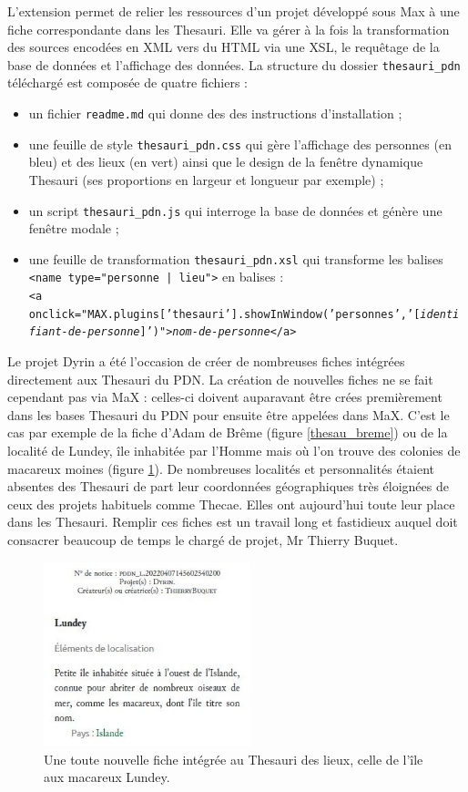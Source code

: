 \documentclass[a4paper,12pt,twoside]{book}
\begin{document}
L'extension permet de relier les ressources d'un projet développé sous Max à une fiche correspondante dans les Thesauri. Elle va gérer à la fois la transformation des sources encodées en XML vers du \acrshort{HTML} via une \acrshort{XSL}, le requêtage de la base de données et l'affichage des données. La structure du dossier \texttt{thesauri\_pdn} téléchargé est composée de quatre fichiers :
\begin{itemize}
    \item un fichier \texttt{readme.md} qui donne des  des instructions d'installation ;
    \item une feuille de style  \texttt{thesauri\_pdn.css} qui gère l'affichage des personnes (en bleu) et des lieux (en vert) ainsi que le design de la fenêtre dynamique Thesauri (ses proportions en largeur et longueur par exemple) ;
    \item un script \texttt{thesauri\_pdn.js} qui interroge la base de données et génère une fenêtre modale ;
    \item une feuille de transformation \texttt{thesauri\_pdn.xsl} qui transforme les balises \\\texttt{<name type="personne | lieu">} en balises :\\\texttt{<a onclick="MAX.plugins['thesauri'].showInWindow('personnes','[\textit{identi\\fiant-de-personne}]')">\textit{nom-de-personne}</a>}
\end{itemize}

Le projet Dyrin a été l'occasion de créer de nombreuses fiches intégrées directement aux Thesauri du \acrshort{PDN}. La création de nouvelles fiches ne se fait cependant pas via MaX : celles-ci doivent auparavant être crées premièrement dans les bases Thesauri du \acrshort{PDN} pour ensuite être appelées dans MaX.  C'est le cas par exemple de la fiche d'Adam de Brême (figure \ref{thesau_breme}) ou de la localité de Lundey, île inhabitée par l'Homme mais où l'on trouve des colonies de macareux moines (figure \ref{lundey}). De nombreuses localités et personnalités étaient absentes des Thesauri de part leur coordonnées géographiques très éloignées de ceux des projets habituels comme Thecae. Elles ont aujourd'hui toute leur place dans les Thesauri. Remplir ces fiches est un travail long et fastidieux auquel doit consacrer beaucoup de temps le chargé de projet, Mr Thierry Buquet.

\begin{figure}[H]
    \centering
    \includegraphics[width=6cm]{img/partie_3/lundey.JPG}
    \caption{Une toute nouvelle fiche intégrée au Thesauri des lieux, celle de l'île aux macareux Lundey.}
    \label{lundey}
\end{figure}
\end{document}

